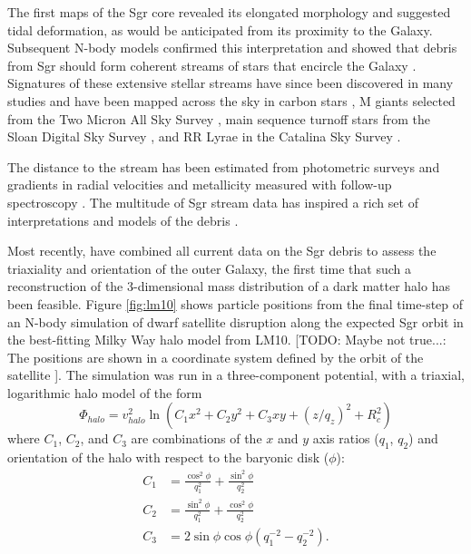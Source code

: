 \documentclass[preprint]{aastex}
\begin{document}
The first maps of the Sgr core \citep{ibata94, ibata95} revealed
its elongated morphology and suggested tidal deformation, as would be
anticipated from its proximity to the Galaxy. Subsequent N-body models
confirmed this interpretation \citep{velazquez95} and showed that
debris from Sgr should form coherent streams of stars that encircle
the Galaxy \citep{johnston95}. Signatures of these extensive stellar
streams have since been discovered in many studies and have been
mapped across the sky in carbon stars \citep{totten98}, M giants
selected from the Two Micron All Sky Survey \citep{majewski03}, main
sequence turnoff stars from the Sloan Digital Sky Survey
\citep{belokurov06}, and RR Lyrae in the Catalina Sky Survey
\citep{drake13}.

The distance to the stream has been estimated from photometric surveys
\citep[e.g.,][]{martinezdelgado04} and gradients in radial
velocities and metallicity measured with follow-up spectroscopy
\citep[e.g.,][]{majewski04, vivas05, bellazzini06, chou07,
  chou10, keller10, carlin12}. The multitude of Sgr stream data
has inspired a rich set of interpretations and models of the debris
\citep[e.g.,][]{johnston99b, helmi04, law05, fellhauer06,
  law10}.

Most recently, \citet[][hereafter LM10]{law10} have combined all
current data on the Sgr debris to assess the triaxiality and orientation
of the outer Galaxy, the first time that such a reconstruction of
the 3-dimensional mass distribution of a dark matter halo has been
feasible. Figure \ref{fig:lm10} shows particle positions from the final time-step of an N-body simulation of dwarf satellite disruption along the expected Sgr
orbit in the best-fitting Milky Way halo model from LM10. [TODO: Maybe not true...: The positions are shown in a coordinate system defined
by the orbit of the satellite \citep{majewski04}]. The
simulation was run in a three-component potential, with a triaxial,
logarithmic halo model of the form
\begin{equation}
  \Phi_{halo} = v_{halo}^2 \ln(C_1 x^2 + C_2 y^2 + C_3 xy + (z/q_z)^2 + R_c^2)
\end{equation}
where $C_1$, $C_2$, and $C_3$ are combinations of the $x$ and $y$ axis ratios ($q_1$, $q_2$) and orientation of the halo with respect to the baryonic disk ($\phi$):
\begin{align}
  C_1 &= \frac{\cos^2\phi}{q_1^2} + \frac{\sin^2\phi}{q_2^2}\\
  C_2 &= \frac{\sin^2\phi}{q_1^2} + \frac{\cos^2\phi}{q_2^2}\\
  C_3 &= 2\sin\phi\cos\phi \left(q_1^{-2} - q_2^{-2}\right).
\end{align}
\end{document}
